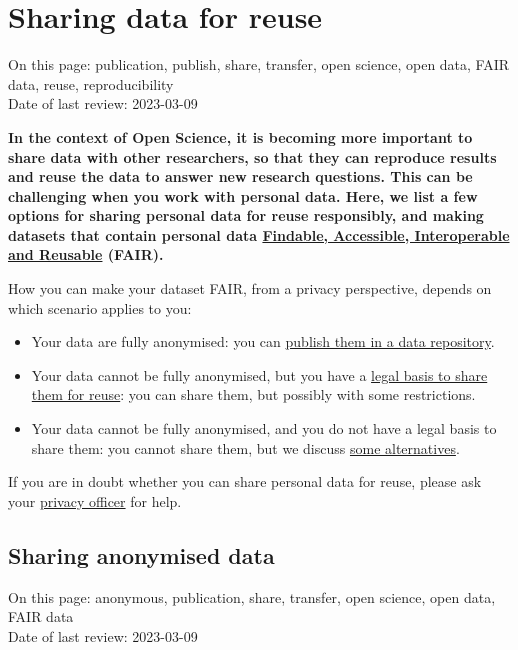 \documentclass[
]{book}
\providecommand{\tightlist}{%
  \setlength{\itemsep}{0pt}\setlength{\parskip}{0pt}}
\begin{document}
\hypertarget{data-sharing-reuse}{%
\chapter{Sharing data for reuse}\label{data-sharing-reuse}}

On this page: publication, publish, share, transfer, open science, open data,
FAIR data, reuse, reproducibility\\
Date of last review: 2023-03-09

\textbf{In the context of Open Science, it is becoming more important to share data with
other researchers, so that they can reproduce results and reuse the data to
answer new research questions. This can be challenging when you work with
personal data. Here, we list a few options for sharing personal data for reuse
responsibly, and making datasets that contain personal data
\href{https://www.uu.nl/en/research/research-data-management/guides/how-to-make-your-data-fair}{Findable, Accessible, Interoperable and Reusable}
(FAIR).}

How you can make your dataset FAIR, from a privacy perspective, depends on
which scenario applies to you:

\begin{itemize}
\tightlist
\item
  Your data are fully anonymised: you can
  \protect\hyperlink{publish-anonymous-data}{publish them in a data repository}.
\item
  Your data cannot be fully anonymised, but you have a
  \protect\hyperlink{share-reuse-legal-basis}{legal basis to share them for reuse}: you can share
  them, but possibly with some restrictions.
\item
  Your data cannot be fully anonymised, and you do not have a legal basis to
  share them: you cannot share them, but we discuss
  \protect\hyperlink{sharing-reuse-alternatives}{some alternatives}.
\end{itemize}

If you are in doubt whether you can share personal data for reuse, please ask
your \protect\hyperlink{support}{privacy officer} for help.

\hypertarget{publish-anonymous-data}{%
\section{Sharing anonymised data}\label{publish-anonymous-data}}

On this page: anonymous, publication, share, transfer, open science, open data,
FAIR data\\
Date of last review: 2023-03-09
\end{document}
